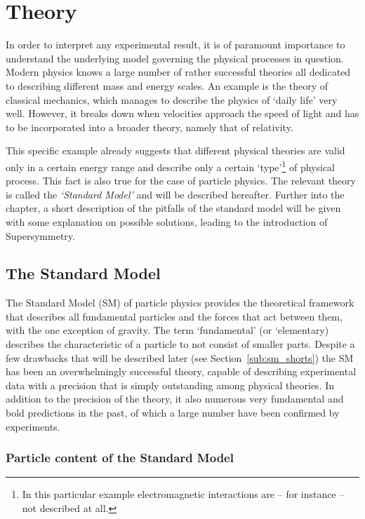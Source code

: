 \chapter{Theory}
\label{ch:theory}
In order to interpret any experimental result, it is of paramount importance to understand
the underlying model governing the physical processes in question. Modern physics knows a
large number of rather successful theories all dedicated to describing different mass and 
energy scales. An example is the theory of classical mechanics, which manages to describe the 
physics of `daily life' very well. However, it breaks down when velocities approach
the speed of light and has to be incorporated into a broader theory, namely that of relativity.

This specific example already suggests that different physical theories are valid only in a 
certain energy range and describe only a certain `type'\footnote{In this particular example
electromagnetic interactions are -- for instance -- not described at all.} of physical process. 
This fact is also true for the case of particle physics. The relevant theory is called the 
\textit{`Standard Model'} and will be described hereafter. Further into the chapter,
a short description of the pitfalls of the standard model will be given with some explanation
on possible solutions, leading to the introduction of Supersymmetry.

\section{The Standard Model}
\label{sec:standardmodel}
The Standard Model (SM) of particle physics provides the theoretical framework that
describes all fundamental particles and the forces that act between them, with the one
exception of gravity. The term `fundamental' (or `elementary) describes the characteristic of a particle to
not consist of smaller parts. Despite a few drawbacks that will be described later (see Section~\ref{sub:sm_shorts})
the SM has been an overwhelmingly successful theory, capable of describing experimental data
with a precision that is simply outstanding among physical theories. In addition to the 
precision of the theory, it also numerous very fundamental and bold predictions in the past,
of which a large number have been confirmed by experiments.

\subsection{Particle content of the Standard Model}
\label{sub:sm_particles}

